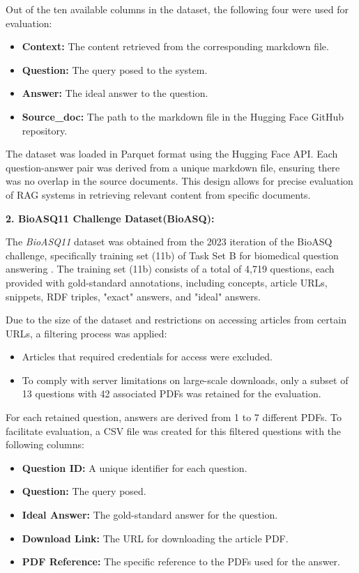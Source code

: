 \documentclass[pdflatex,sn-mathphys-num]{sn-jnl}%
\theoremstyle{thmstyleone}%
\theoremstyle{thmstyletwo}%
\theoremstyle{thmstylethree}%
\begin{document}
Out of the ten available columns in the dataset, the following four were used for evaluation:
\begin{itemize}
    \item \textbf{Context:} The content retrieved from the corresponding markdown file.
    \item \textbf{Question:} The query posed to the system.
    \item \textbf{Answer:} The ideal answer to the question.
    \item \textbf{Source\_doc:} The path to the markdown file in the Hugging Face GitHub repository.
\end{itemize}

The dataset was loaded in Parquet format using the Hugging Face API. Each question-answer pair was derived from a unique markdown file, ensuring there was no overlap in the source documents. This design allows for precise evaluation of RAG systems in retrieving relevant content from specific documents.

\textbf{2. BioASQ11 Challenge Dataset(BioASQ):}

The \textit{BioASQ11} dataset was obtained from the 2023 iteration of the BioASQ challenge, specifically training set (11b) of Task Set B for biomedical question answering \cite{bioasq2023}. The training set (11b) consists of a total of 4,719 questions, each provided with gold-standard annotations, including concepts, article URLs, snippets, RDF triples, "exact" answers, and "ideal" answers.

Due to the size of the dataset and restrictions on accessing articles from certain URLs, a filtering process was applied:
\begin{itemize}
    \item Articles that required credentials for access were excluded.
    \item To comply with server limitations on large-scale downloads, only a subset of 13 questions with 42 associated PDFs was retained for the evaluation.
\end{itemize}

For each retained question, answers are derived from 1 to 7 different PDFs. To facilitate evaluation, a CSV file was created for this filtered questions with the following columns:
\begin{itemize}
    \item \textbf{Question ID:} A unique identifier for each question.
    \item \textbf{Question:} The query posed.
    \item \textbf{Ideal Answer:} The gold-standard answer for the question.
    \item \textbf{Download Link:} The URL for downloading the article PDF.
    \item \textbf{PDF Reference:} The specific reference to the PDFs used for the answer.
\end{itemize}
\end{document}
